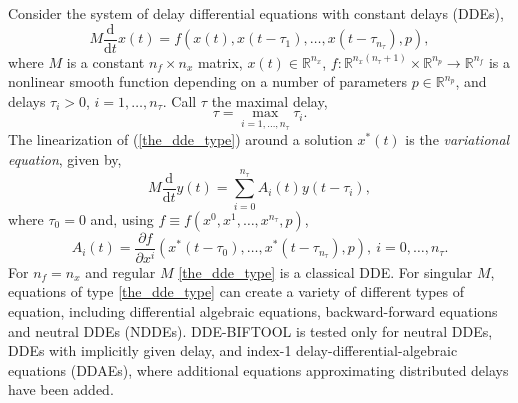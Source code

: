 \documentclass[10pt]{scrartcl}
\newcommand{\DDEBIFCODE}{\textsc{DDE-BIFTOOL}}
\newcommand{\define}[1]{\emph{#1}}
\renewcommand{\d}{\mathrm{d}}
\newcommand{\RR}{\mathbb{R}}
\begin{document}
Consider the system of delay differential equations with constant
delays (DDEs),
\begin{equation}\label{the_dde_type}
M\frac{\d}{\d t}{x(t)}=f(x(t),x(t-\tau_1),\ldots,x(t-\tau_{n_\tau}),p),
\end{equation}
where $M$ is a constant $n_f\times n_x$ matrix, $x(t)\in\RR^{n_x}$,
$f:\RR^{n_x(n_\tau+1)}\times\RR^{n_p} \rightarrow\RR^{n_f}$ is a nonlinear smooth
function depending on a number of parameters $p\in\RR^{n_p}$, and
delays $\tau_i>0$, $i=1,\ldots,n_\tau$.  Call $\tau$ the maximal delay,
\[
\tau=\max_{i=1,\ldots,n_\tau}\tau_i.
\]
The linearization of (\ref{the_dde_type}) around a solution $x^*(t)$ 
is the \define{variational equation}, given by,
\begin{equation}\label{the_var_equa}
M\frac{\d}{\d t}{y(t)}=\sum_{i=0}^{n_\tau} A_i(t)y(t-\tau_i),
\end{equation}
where $\tau_0=0$ and, using $f\equiv f(x^0,x^1,\ldots,x^{n_\tau},p)$,  
\begin{equation}\label{A_def}
A_i(t)=\frac{\partial f}{\partial x^i}(x^*(t-\tau_0),\ldots,x^*(t-\tau_{n_\tau}),p), 
\ i=0,\ldots,n_\tau. 
\end{equation}
For  $n_f=n_x$ and regular $M$ \cref{the_dde_type} is a classical
DDE. For singular $M$, equations of type \eqref{the_dde_type} can
create a variety of different types of equation, including
differential algebraic equations, backward-forward equations and
neutral DDEs (NDDEs). \DDEBIFCODE{} is tested only for neutral DDEs,
DDEs with implicitly given delay, and index-1
delay-differential-algebraic equations (DDAEs), where additional
equations approximating distributed delays have been added.
\end{document}
